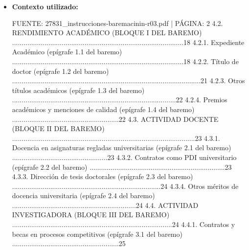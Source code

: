 \documentclass{article}
\begin{document}
\begin{itemize}
\begin{itemize}
                En cuanto a los plazos y fechas, no se especifican fechas concretas en el contexto proporcionado. Sin embargo, se menciona que la edición de la clasificación de referencia para la baremación es la del año de publicación del artículo, o en su defecto, la inmediata anterior. También se menciona que la Revisión 4 del documento de ayuda al candidato es de \textbf{marzo de 2025}, y la Revisión 3 es de \textbf{diciembre de 2024}.
          \item \textbf{Contexto utilizado:}
                \begin{scriptsize}
                  FUENTE: 27831\_instrucciones-baremacinin-r03.pdf | PÁGINA: 2
                  4.2. RENDIMIENTO ACADÉMICO (BLOQUE I DEL BAREMO) ..........................................................................................18
                  4.2.1. Expediente Académico (epígrafe 1.1 del baremo) ..........................................................................................18
                  4.2.2. Título de doctor (epígrafe 1.2 del baremo) ...................................................................................................21
                  4.2.3. Otros títulos académicos (epígrafe 1.3 del baremo) ......................................................................................22
                  4.2.4. Premios académicos y menciones de calidad (epígrafe 1.4 del baremo) ........................................................22
                  4.3. ACTIVIDAD DOCENTE (BLOQUE II DEL BAREMO) ................................................................................................23
                  4.3.1. Docencia en asignaturas regladas universitarias (epígrafe 2.1 del baremo) ..................................................23
                  4.3.2. Contratos como PDI universitario (epígrafe 2.2 del baremo) .......................................................................23
                  4.3.3. Dirección de tesis doctorales (epígrafe 2.3 del baremo) ..............................................................................24
                  4.3.4. Otros méritos de docencia universitaria (epígrafe 2.4 del baremo) .................................................................24
                  4.4. ACTIVIDAD INVESTIGADORA (BLOQUE III DEL BAREMO) ....................................................................................24
                  4.4.1. Contratos y becas en procesos competitivos (epígrafe 3.1 del baremo) ........................................................25

\end{scriptsize}
\end{itemize}
\end{itemize}
\end{document}
